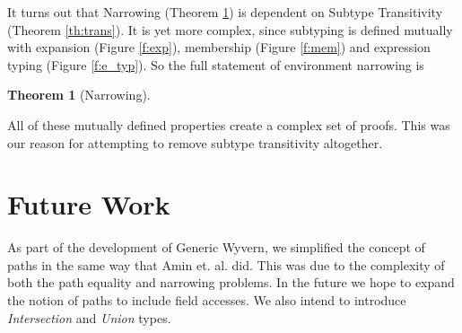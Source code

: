 \documentclass[11pt
              , a4paper
              , twoside
              , openright
              ]{report}
\newtheorem{theorem}{Theorem}
\numberwithin{case}{theorem}
\numberwithin{subcase}{case}
\begin{document}
It turns out that Narrowing (Theorem \ref{th:narrow}) is dependent on Subtype Transitivity (Theorem \ref{th:trans}). It is yet more complex, since subtyping is defined mutually with expansion (Figure \ref{f:exp}), membership (Figure \ref{f:mem}) and expression typing (Figure \ref{f:e_typ}). So the full statement of environment narrowing is 
\begin{theorem}[Narrowing]\label{th:narrow}
\end{theorem}
All of these mutually defined properties create a complex set of proofs. This was our reason for attempting to remove subtype transitivity altogether.





\chapter{Future Work}\label{ch:future}

As part of the development of Generic Wyvern, we simplified the concept of paths in the same way that Amin et. al. \cite{Amin 2014} did. This was due to the complexity of both the path equality and narrowing problems. In the future we hope to expand the notion of paths to include field accesses. We also intend to introduce \emph{Intersection} and \emph{Union} types. 
\end{document}
